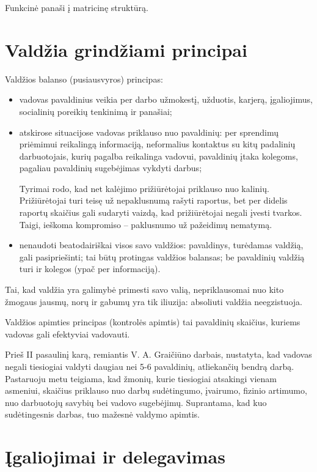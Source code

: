 Funkcinė panaši į matricinę struktūrą.

\section{Valdžia grindžiami principai}

Valdžios balanso (pusiausvyros) principas:
\begin{itemize}
  \item vadovas pavaldinius veikia per darbo užmokestį, užduotis, karjerą,
    įgaliojimus, socialinių poreikių tenkinimą ir panašiai;
  \item atskirose situacijose vadovas priklauso nuo pavaldinių: per
    sprendimų priėmimui reikalingą informaciją, neformalius kontaktus
    su kitų padalinių darbuotojais, kurių pagalba reikalinga vadovui,
    pavaldinių įtaka kolegoms, pagaliau pavaldinių sugebėjimas vykdyti
    darbus;
    \begin{exmp}
      Tyrimai rodo, kad net kalėjimo prižiūrėtojai priklauso nuo kalinių.
      Prižiūrėtojai turi teisę už nepaklusnumą rašyti raportus, bet
      per didelis raportų skaičius gali sudaryti vaizdą, kad prižiūrėtojai
      negali įvesti tvarkos. Taigi, ieškoma kompromiso – paklusnumo
      už pažeidimų nematymą.
    \end{exmp}
  \item nenaudoti beatodairiškai visos savo valdžios: pavaldinys,
    turėdamas valdžią, gali pasipriešinti; tai būtų protingas valdžios
    balansas; be pavaldinių valdžią turi ir kolegos (ypač per informaciją).
\end{itemize}
Tai, kad valdžia yra galimybė primesti savo valią, nepriklausomai nuo
kito žmogaus jausmų, norų ir gabumų yra tik iliuzija: absoliuti valdžia
neegzistuoja.


Valdžios apimties principas (kontrolės apimtis) tai pavaldinių
skaičius, kuriems vadovas gali efektyviai vadovauti.

Prieš II pasaulinį karą, remiantis V. A. Graičiūno darbais,
nustatyta, kad vadovas negali tiesiogiai valdyti daugiau nei 5-6
pavaldinių, atliekančių bendrą darbą. Pastaruoju metu teigiama, kad
žmonių, kurie tiesiogiai atsakingi vienam asmeniui, skaičius
priklauso nuo darbų sudėtingumo, įvairumo, fizinio artimumo, nuo
darbuotojų savybių bei vadovo sugebėjimų. Suprantama, kad kuo
sudėtingesnis darbas, tuo mažesnė valdymo apimtis.

\section{Įgaliojimai ir delegavimas}

